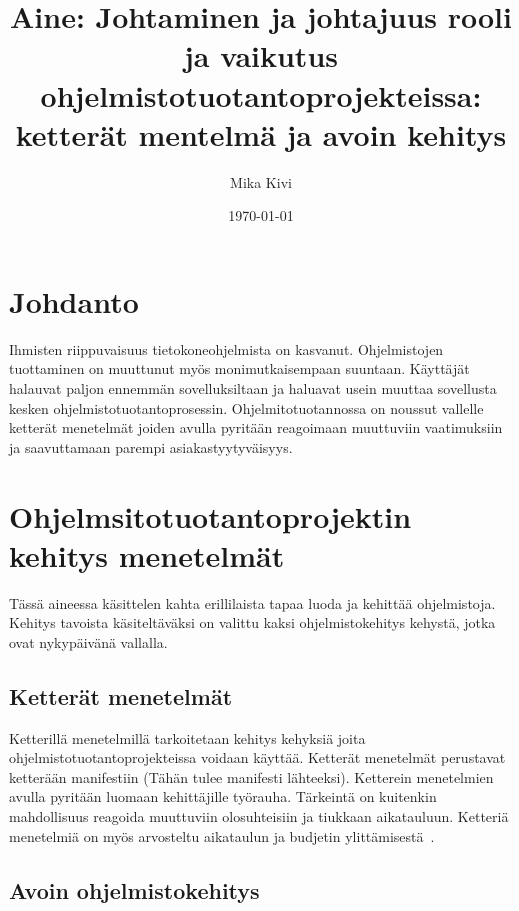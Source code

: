 \documentclass[finnish]{tktltiki2}
\title{Aine: Johtaminen ja johtajuus rooli ja vaikutus ohjelmistotuotantoprojekteissa: ketterät mentelmä ja avoin kehitys}
\author{Mika Kivi}
\date{\today}
\theoremstyle{definition}
\theoremstyle{remark}
\begin{document}

\maketitle        %
\makeabstract     %

\tableofcontents  %
\newpage          %



\section{Johdanto}

Ihmisten riippuvaisuus tietokoneohjelmista on kasvanut. Ohjelmistojen tuottaminen on muuttunut myös monimutkaisempaan suuntaan. Käyttäjät halauvat paljon ennemmän sovelluksiltaan ja haluavat usein muuttaa sovellusta kesken ohjelmistotuotantoprosessin. Ohjelmitotuotannossa on noussut vallelle ketterät menetelmät joiden avulla pyritään reagoimaan muuttuviin vaatimuksiin ja saavuttamaan parempi asiakastyytyväisyys. 


\section{Ohjelmsitotuotantoprojektin kehitys menetelmät}

Tässä aineessa käsittelen kahta erillilaista tapaa luoda ja  kehittää ohjelmistoja. Kehitys tavoista käsiteltäväksi on valittu kaksi ohjelmistokehitys kehystä, jotka ovat nykypäivänä vallalla.  

\subsection{Ketterät menetelmät}

Ketterillä menetelmillä tarkoitetaan kehitys kehyksiä joita ohjelmistotuotantoprojekteissa voidaan käyttää. Ketterät menetelmät perustavat ketterään manifestiin (Tähän tulee manifesti lähteeksi). Ketterein menetelmien avulla pyritään luomaan kehittäjille työrauha. Tärkeintä on kuitenkin mahdollisuus reagoida muuttuviin olosuhteisiin ja tiukkaan aikatauluun. Ketteriä menetelmiä on myös arvosteltu aikataulun ja budjetin ylittämisestä~\cite{Guo:2008:SSP:1414004.1414046}.

\subsection{Avoin ohjelmistokehitys}
\end{document}
